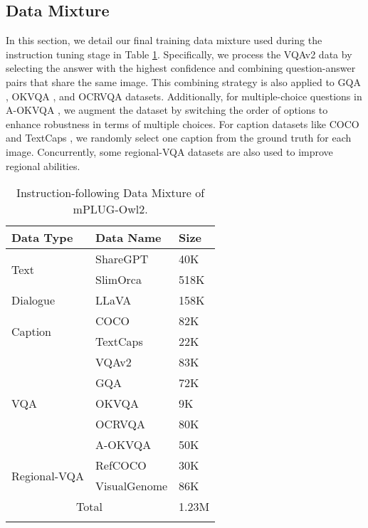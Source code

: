 \documentclass[10pt,twocolumn,letterpaper]{article}
\newlength\savewidth
\newcommand\shline{\noalign{\global\savewidth\arrayrulewidth\global\arrayrulewidth 1pt}\hline\noalign{\global\arrayrulewidth\savewidth}}
\newcommand{\modelname}{mPLUG-Owl2\xspace}
\begin{document}
\subsection{Data Mixture}
In this section, we detail our final training data mixture used during the instruction tuning stage in Table \ref{tab:data_mixture}. Specifically, we process the VQAv2 \cite{balanced_vqa_v2} data by selecting the answer with the highest confidence and combining question-answer pairs that share the same image. This combining strategy is also applied to GQA \cite{hudson2019gqa}, OKVQA \cite{marino2019okvqa}, and OCRVQA \cite{mishra2019ocrvqa} datasets. Additionally, for multiple-choice questions in A-OKVQA \cite{schwenk2022aokvqa}, we augment the dataset by switching the order of options to enhance robustness in terms of multiple choices. For caption datasets like COCO \cite{lin2014coco} and TextCaps \cite{sidorov2020textcaps}, we randomly select one caption from the ground truth for each image. Concurrently, some regional-VQA \cite{yu2016refcoco, krishna2017visualgenome} datasets are also used to improve regional abilities.
\begin{table}[!htbp]
\small
    \centering
    \begin{tabular}{l|ll}
         \shline
         \textbf{Data Type} & \textbf{Data Name} & \textbf{Size} \\
         \hline
         \multirow{2}{*}{Text} & ShareGPT \cite{ShareGPT2023} & 40K \\
         & SlimOrca \cite{SlimOrca} & 518K \\ \hline
         Dialogue & LLaVA \cite{Liu2023Llava} & 158K \\ \hline
         \multirow{2}{*}{Caption} & COCO \cite{lin2014coco} & 82K \\
         & TextCaps \cite{sidorov2020textcaps} & 22K \\ \hline
         \multirow{5}{*}{VQA} & VQAv2 \cite{balanced_vqa_v2} & 83K \\
         & GQA \cite{hudson2019gqa} & 72K \\
         & OKVQA \cite{marino2019okvqa} & 9K \\
         & OCRVQA \cite{mishra2019ocrvqa} & 80K \\
         & A-OKVQA \cite{schwenk2022aokvqa} & 50K \\ \hline
         \multirow{2}{*}{Regional-VQA} & RefCOCO \cite{yu2016refcoco} & 30K \\
         & VisualGenome \cite{krishna2017visualgenome} & 86K \\ \hline
         \multicolumn{2}{c}{Total} & 1.23M  \\
         \shline 
    \end{tabular}
    \caption{Instruction-following Data Mixture of \modelname.}
    \label{tab:data_mixture}
\end{table}
\end{document}
